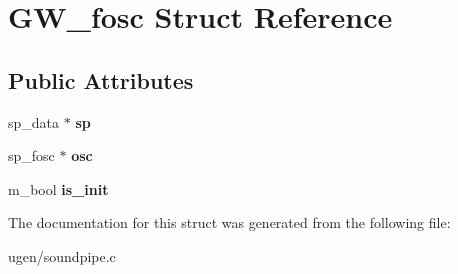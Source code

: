 \hypertarget{structGW__fosc}{}\section{G\+W\+\_\+fosc Struct Reference}
\label{structGW__fosc}
\subsection*{Public Attributes}
\begin{DoxyCompactItemize}
\item 
\hypertarget{structGW__fosc_a32418ef4b5c936361107c9a3dbe0008b}{}\label{structGW__fosc_a32418ef4b5c936361107c9a3dbe0008b} 
sp\+\_\+data $\ast$ {\bfseries sp}
\item 
\hypertarget{structGW__fosc_ae64e81924f86ee5b7f6260eef693009d}{}\label{structGW__fosc_ae64e81924f86ee5b7f6260eef693009d} 
sp\+\_\+fosc $\ast$ {\bfseries osc}
\item 
\hypertarget{structGW__fosc_af31a3fb6d3ce41f4082d715c2404d81e}{}\label{structGW__fosc_af31a3fb6d3ce41f4082d715c2404d81e} 
m\+\_\+bool {\bfseries is\+\_\+init}
\end{DoxyCompactItemize}


The documentation for this struct was generated from the following file\+:\begin{DoxyCompactItemize}
\item 
ugen/soundpipe.\+c\end{DoxyCompactItemize}
